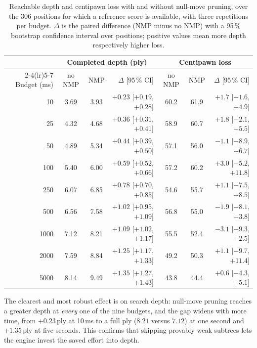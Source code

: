 \begin{table}[ht]
\centering
\begin{tabular}{@{}rccrccr@{}}
\toprule
 & \multicolumn{3}{c}{Completed depth (ply)} & \multicolumn{3}{c}{Centipawn loss} \\
\cmidrule(lr){2-4}\cmidrule(lr){5-7}
Budget (ms) & no NMP & NMP & $\Delta$ [95\,\% CI] & no NMP & NMP & $\Delta$ [95\,\% CI] \\ \midrule
10   & 3.69 & 3.93 & $+0.23$ [$+0.19$, $+0.28$] & 60.2 & 61.9 & $+1.7$ [$-1.6$, $+4.9$] \\
25   & 4.32 & 4.68 & $+0.36$ [$+0.31$, $+0.41$] & 58.9 & 60.7 & $+1.8$ [$-2.1$, $+5.5$] \\
50   & 4.89 & 5.34 & $+0.44$ [$+0.39$, $+0.50$] & 57.1 & 56.0 & $-1.1$ [$-8.9$, $+6.7$] \\
100  & 5.40 & 6.00 & $+0.59$ [$+0.52$, $+0.66$] & 57.2 & 60.2 & $+3.0$ [$-5.2$, $+11.8$] \\
250  & 6.07 & 6.85 & $+0.78$ [$+0.70$, $+0.85$] & 54.6 & 55.7 & $+1.1$ [$-7.5$, $+8.5$] \\
500  & 6.56 & 7.58 & $+1.02$ [$+0.95$, $+1.09$] & 56.8 & 55.0 & $-1.9$ [$-8.1$, $+3.8$] \\
1000 & 7.12 & 8.21 & $+1.09$ [$+1.02$, $+1.17$] & 55.5 & 52.4 & $-3.1$ [$-9.3$, $+2.5$] \\
2000 & 7.59 & 8.84 & $+1.25$ [$+1.17$, $+1.33$] & 49.2 & 50.3 & $+1.1$ [$-9.7$, $+11.4$] \\
5000 & 8.14 & 9.49 & $+1.35$ [$+1.27$, $+1.43$] & 43.8 & 44.4 & $+0.6$ [$-4.3$, $+5.1$] \\ \bottomrule
\end{tabular}
\caption{Reachable depth and centipawn loss with and without null-move pruning,
over the 306 positions for which a reference score is available, with three
repetitions per budget. $\Delta$ is the paired difference (NMP minus no NMP) with
a 95\,\% bootstrap confidence interval over positions; positive values mean more
depth respectively higher loss.}
\label{tab:nmp_depth_cpl}
\end{table}

The clearest and most robust effect is on search depth: null-move pruning reaches
a greater depth at \emph{every} one of the nine budgets, and the gap widens with
more time, from $+0.23$\,ply at 10\,ms to a full ply ($8.21$ versus $7.12$) at one
second and $+1.35$\,ply at five seconds. This confirms that skipping provably
weak subtrees lets the engine invest the saved effort into depth.

